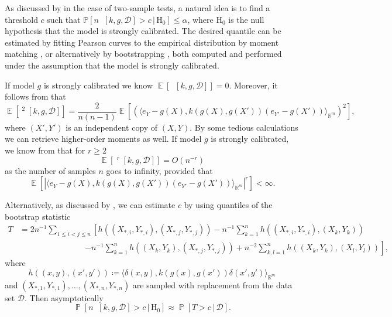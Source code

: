 \documentclass{article}
\DeclareMathOperator{\Prob}{\mathbb{P}}
\DeclareMathOperator{\Expect}{\mathbb{E}}
\DeclareMathOperator{\unbiasedestimator}{\widehat{SKCE}_{uq}}
\newcommand{\nullhypothesis}{\mathrm{H}_0}
\newcommand{\given}{\,|\,}
\begin{document}
As discussed by \citet{gretton12_kernel_two_sampl_test} in the case of two-sample
tests, a natural idea is to find a threshold $c$ such that
$\mathbb{P}[n \unbiasedestimator[k, g, \mathcal{D}] > c \given \nullhypothesis] \leq \alpha$,
where $\nullhypothesis$ is the null hypothesis that the model is strongly
calibrated. The desired quantile can be estimated by fitting Pearson curves to
the empirical distribution by moment matching
\citep{gretton12_kernel_two_sampl_test}, or alternatively by
bootstrapping \citep{arcones92_boots_u_v_statis}, both computed and performed
under the assumption that the model is strongly calibrated.

If model $g$ is strongly calibrated we know
$\Expect[\unbiasedestimator[k, g, \mathcal{D}]] = 0$. Moreover, it follows from
\citet[p.~299][]{hoeffding48_class_statis_with_asymp_normal_distr} that
\begin{equation*}
  \Expect\left[\unbiasedestimator^2[k, g, \mathcal{D}]\right] = \frac{2}{n(n-1)} \Expect\left[{\left(\langle e_Y - g(X), k(g(X),g(X')) (e_{Y'} - g(X')) \rangle_{\mathbb{R}^m}\right)}^2\right],
\end{equation*}
where $(X',Y')$ is an independent copy of $(X,Y)$. By some tedious calculations
we can retrieve higher-order moments as well. If model $g$ is strongly
calibrated, we know from
\citet[Lemma~B, Section~5.2.2]{serfling80_approx_theor_mathem_statis} that for
$r \geq 2$
\begin{equation*}
  \Expect\left[\unbiasedestimator^r[k, g, \mathcal{D}]\right] = O(n^{-r})
\end{equation*}
as the number of samples $n$ goes to infinity, provided that
\begin{equation*}
  \Expect\left[{\left|\langle e_Y - g(X), k(g(X),g(X')) (e_{Y'} - g(X')) \rangle_{\mathbb{R}^m}\right|}^r\right] < \infty.
\end{equation*}

Alternatively, as discussed by \citet[Section~5][]{arcones92_boots_u_v_statis},
we can estimate $c$ by using quantiles of the bootstrap statistic
\begin{equation*}
  \begin{split}
    T &= 2 n^{-1} \sum_{1 \leq i < j \leq n} \left[ h((X_{*,i},Y_{*,i}), (X_{*,j},Y_{*,j})) - n^{-1} \sum_{k=1}^n h((X_{*,i},Y_{*,i}),(X_k,Y_k)) \right. \\
    &\qquad \qquad \qquad \qquad \left. - n^{-1} \sum_{k=1}^n h((X_k,Y_k),(X_{*,j},Y_{*,j})) + n^{-2} \sum_{k,l=1}^n h((X_k,Y_k),(X_l,Y_l))\right],
  \end{split}
\end{equation*}
where
\begin{equation*}
  h((x,y),(x',y')) \coloneqq \langle \delta(x,y), k(g(x),g(x')) \delta(x',y') \rangle_{\mathbb{R}^m}
\end{equation*}
and $(X_{*,1},Y_{*,1}),\ldots,(X_{*,n},Y_{*,n})$ are sampled with replacement
from the data set $\mathcal{D}$. Then asymptotically
\begin{equation*}
  \Prob\left[n \unbiasedestimator[k, g, \mathcal{D}] > c \given \nullhypothesis \right] \approx \Prob[T > c \given \mathcal{D}].
\end{equation*}
\end{document}
